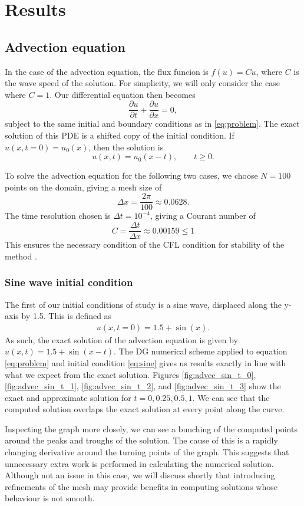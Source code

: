 \section{Results}
\subsection{Advection equation}

In the case of the advection equation, the flux funcion is $f(u)=Cu$, where $C$ is the wave speed of the solution.
For simplicity, we will only consider the case where $C=1$.
Our differential equation then becomes
\[
	\frac{\partial u}{\partial t} + \frac{\partial u}{\partial x} = 0,
\]
subject to the same initial and boundary conditions as in \eqref{eq:problem}.
The exact solution of this PDE is a shifted copy of the initial condition.
If $u(x,t=0)=u_0(x)$, then the solution is
\[
	u(x,t) = u_0(x-t), \qquad t \geq 0.
\]

To solve the advection equation for the following two cases, we choose $N=100$ points on the domain, giving a mesh size of 
\[
\Delta x = \frac{2\pi}{100} \approx 0.0628.
\]
The time resolution chosen is $\Delta t = 10^{-4}$, giving a Courant number of
\[
	C = \frac{\Delta t}{\Delta x} \approx 0.00159 \leq 1
\]
This ensures the necessary condition of the CFL condition for stability of the method \cite{leveque1992numerical}.

\subsubsection{Sine wave initial condition}
\label{sec:advecsine}
The first of our initial conditions of study is a sine wave, displaced along the y-axis by 1.5.
This is defined as
\begin{align}
	u(x,t=0) = 1.5+\sin(x). \label{eq:sine}
\end{align}
As such, the exact solution of the advection equation is given by $u(x,t)=1.5+\sin(x-t)$.
The DG numerical scheme applied to equation \eqref{eq:problem} and initial condition \eqref{eq:sine} gives us results exactly in line with what we expect from the exact solution.
Figures \ref{fig:advec_sin_t_0}, \ref{fig:advec_sin_t_1}, \ref{fig:advec_sin_t_2}, and \ref{fig:advec_sin_t_3} show the exact and approximate solution for $t=0, 0.25, 0.5, 1$.
We can see that the computed solution overlaps the exact solution at every point along the curve.

Inspecting the graph more closely, we can see a bunching of the computed points around the peaks and troughs of the solution.
The cause of this is a rapidly changing derivative around the turning points of the graph.
This suggests that unnecessary extra work is performed in calculating the numerical solution.
Although not an issue in this case, we will discuss shortly that introducing refinements of the mesh may provide benefits in computing solutions whose behaviour is not smooth.

